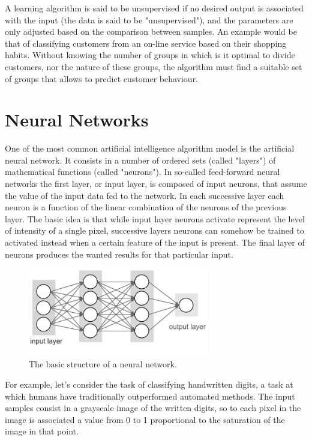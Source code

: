 \documentclass[a4paper]{report}
\begin{document}
A learning algorithm is said to be unsupervised if no desired output is associated with the input (the data is said to be "unsupervised"), and the parameters are only adjusted based on the comparison between samples.
An example would be that of classifying customers from an on-line service based on their shopping habits.
Without knowing the number of groups in which is it optimal to divide customers, nor the nature of these groups, the algorithm must find a suitable set of groups that allows to predict customer behaviour.

\section{Neural Networks}
One of the most common artificial intelligence algorithm model is the artificial neural network.
It consists in a number of ordered sets (called "layers") of mathematical functions (called "neurons").
In so-called feed-forward neural networks the first layer, or input layer, is composed of input neurons, that assume the value of the input data fed to the network.
In each successive layer each neuron is a function of the linear combination of the neurons of the previous layer.
The basic idea is that while input layer neurons activate represent the level of intensity of a single pixel, successive layers neurons can somehow be trained to activated instead when a certain feature of the input is present.
The final layer of neurons produces the wanted results for that particular input.
\begin{figure} [H]
\centering
\includegraphics [width=0.7\textwidth] {o/neuralnetwork.png}
\caption{The basic structure of a neural network.}
\end{figure}
For example, let's consider the task of classifying handwritten digits, a task at which humans have traditionally outperformed automated methods.
The input  samples consist in a grayscale image of the written digits, so to each pixel in the image is associated a value from 0 to 1 proportional to the saturation of the image in that point.
\end{document}
